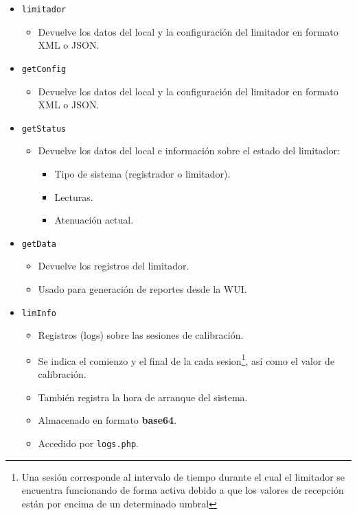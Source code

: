 \begin{itemize}
    \item \verb|limitador|
    \begin{itemize}
        \item Devuelve los datos del local y la configuración del limitador en formato \acrshort{XML} o \acrshort{JSON}.
    \end{itemize}

    \item \verb|getConfig|
    \begin{itemize}
        \item Devuelve los datos del local y la configuración del limitador en formato \acrshort{XML} o \acrshort{JSON}.
    \end{itemize}

    \item \verb|getStatus|
    \begin{itemize}
        \item Devuelve los datos del local e información sobre el estado del limitador:
        \begin{itemize}
            \item Tipo de sistema (registrador o limitador).
            \item Lecturas.
            \item Atenuación actual.
        \end{itemize}
    \end{itemize}

    \item \verb|getData|
    \begin{itemize}
        \item Devuelve los registros del limitador.
        \item Usado para generación de reportes desde la WUI.
    \end{itemize}

    \item \verb|limInfo|
    \begin{itemize}
        \item Registros (logs) sobre las sesiones de calibración.
        \item Se indica el comienzo y el final de la cada \gls{sesion}\footnote{Una sesión corresponde al intervalo de tiempo durante el cual el limitador se encuentra funcionando de forma activa debido a que los valores de recepción están por encima de un determinado umbral}, así como el valor de calibración.
        \item También registra la hora de arranque del sistema.
        \item Almacenado en formato \textbf{base64}.
        \item Accedido por \verb|logs.php|.
    \end{itemize}


\end{itemize}
